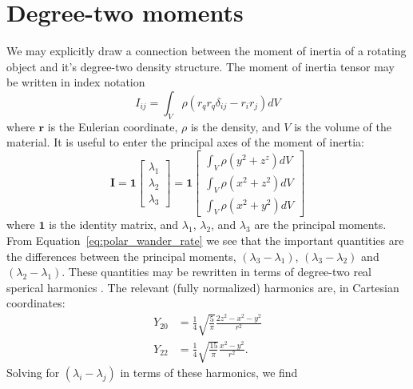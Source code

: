 \documentclass[extra,mreferee]{gji}
\newif\ifdetail
\begin{document}




\appendix

\section{Degree-two moments}
\label{appendix:moments}

We may explicitly draw a connection between the moment of inertia of a rotating object and it's degree-two density structure.  The moment of inertia tensor may be written in index notation
\begin{equation}
I_{ij} = \int_V \rho \left( r_q r_q \delta_{ij} - r_i r_j \right) dV
\label{eq:inertia}
\end{equation}
where $\mathbf{r}$ is the Eulerian coordinate, $\rho$ is the density, and $V$ is the volume of the material.  
It is useful to enter the principal axes of the moment of inertia:
\begin{equation}
\mathbf{I} = \mathbf{1} \begin{bmatrix}
\lambda_1 \\ \lambda_2 \\ \lambda_3
\end{bmatrix} = 
\mathbf{1} \begin{bmatrix}
\int_V \rho (y^2+z^z) dV\\
\int_V \rho (x^2+z^2) dV\\
\int_V \rho (x^2+y^2) dV
\end{bmatrix}
\end{equation}
where $\mathbf{1}$ is the identity matrix, and $\lambda_1$, $\lambda_2$, and $\lambda_3$ are the principal moments.
From Equation~\eqref{eq:polar_wander_rate} we see that the important quantities are the differences between the 
principal moments, $(\lambda_3-\lambda_1)$, $(\lambda_3-\lambda_2)$ and $(\lambda_2-\lambda_1)$.
These quantities may be rewritten in terms of degree-two real sperical harmonics \citep[e.g.][]{dahlen1999theoretical}.
The relevant (fully normalized) harmonics are, in Cartesian coordinates:
\begin{equation}
\begin{aligned}
Y_{20} &= \frac{1}{4} \sqrt{\frac{ 5}{\pi}} \frac{ 2 z^2 - x^2 - y^2}{r^2} \\ 
Y_{22} &= \frac{1}{4} \sqrt{\frac{15}{\pi}} \frac{ x^2 - y^2}{r^2}.
\end{aligned}
\end{equation}
Solving for $( \lambda_i - \lambda_j )$ in terms of these harmonics, we find
\ifdetail
\end{document}
